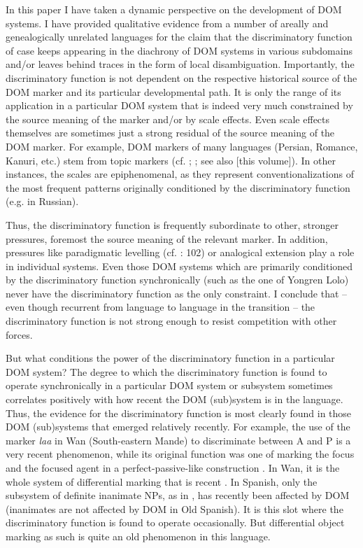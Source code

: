 \documentclass[output=paper]{langsci/langscibook}
\begin{document}
In this paper I have taken a dynamic perspective on the development of DOM systems. I have provided qualitative evidence from a number of areally and genealogically unrelated languages for the claim that the discriminatory function of case keeps appearing in the diachrony of DOM systems in various subdomains and/or leaves behind traces in the form of local disambiguation. Importantly, the discriminatory function is not dependent on the respective historical source of the DOM marker and its particular developmental path. It is only the range of its application in a particular DOM system that is indeed very much constrained by the source meaning of the marker and/or by scale effects. Even scale effects themselves are sometimes just a strong residual of the source meaning of the DOM marker. For example, DOM markers of many languages (Persian, Romance, Kanuri, etc.) stem from topic markers (cf. \citealt{Iemmolo2010}; \citealt{DalrympleNikolaeva2011}; see also \citealt{Cristofaro2018} [this volume]). In other instances, the scales are epiphenomenal, as they represent conventionalizations of the most frequent patterns originally conditioned by the discriminatory function (e.g. in Russian).

Thus, the discriminatory function is frequently subordinate to other, stronger pressures, foremost the source meaning of the relevant marker. In addition, pressures like paradigmatic levelling (cf. \citealt{Jäger2007}: 102) or analogical extension play a role in individual systems. Even those DOM systems which are primarily conditioned by the discriminatory function synchronically (such as the one of Yongren Lolo) never have the discriminatory function as the only constraint. I conclude that – even though recurrent from language to language in the transition – the discriminatory function is not strong enough to resist competition with other forces. 

But what conditions the power of the discriminatory function in a particular DOM system? The degree to which the discriminatory function is found to operate synchronically in a particular DOM system or subsystem sometimes correlates positively with how recent the DOM (sub)system is in the language. Thus, the evidence for the discriminatory function is most clearly found in those DOM (sub)systems that emerged relatively recently. For example, the use of the marker \textit{laa} in Wan (South-eastern Mande) to discriminate between A and P is a very recent phenomenon, while its original function was one of marking the focus and the focused agent in a perfect-passive-like construction \citep{Nikitina2018}. In Wan, it is the whole system of differential marking that is recent \citep{Nikitina2018}. In Spanish, only the subsystem of definite inanimate NPs, as in , has recently been affected by DOM (inanimates are not affected by DOM in Old Spanish). It is this slot where the discriminatory function is found to operate occasionally. But differential object marking as such is quite an old phenomenon in this language.
\end{document}
